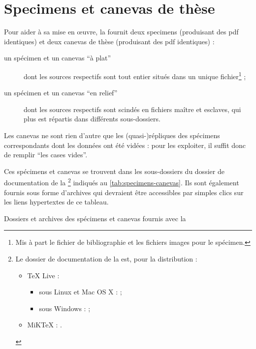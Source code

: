 \chapter{Specimens et canevas de thèse}\label{cha:specimen-canevas}%
%


Pour aider à sa mise en œuvre, la \yatcl fournit deux specimens (produisant
des \gls{pdf} identiques) et deux canevas de thèse (produisant des \gls{pdf}
identiques) :
\begin{description}
\item[un spécimen et un canevas \enquote{à plat}] dont les sources 
  respectifs sont tout entier situés dans un unique fichier\footnote{Mis à part
    le fichier de bibliographie et les fichiers images pour le spécimen.} ;
\item[un spécimen et un canevas \enquote{en relief}] dont les sources
   respectifs sont scindés en fichiers maître et esclaves, qui plus
  est répartis dans différents sous-dossiers.
\end{description}
Les canevas ne sont rien d'autre que les (quasi-)répliques des spécimens
correspondants dont les données ont été vidées : pour les exploiter, il suffit
donc de remplir \enquote{les cases vides}.

%
Ces spécimens et canevas se trouvent dans les sous-dossiers du dossier de
documentation de la \yatcl{}\footnote{Le dossier de documentation de la
  \yatcl{} est, pour la distribution :
  \begin{itemize}
  \item \TeX{} Live :
    \begin{itemize}
    \item sous Linux et Mac OS X :
      \unixtldirectory\tldistdirectory\jobdocdirectory{} ;
    \item sous Windows :
      \wintldirectory\tldistdirectory\jobdocdirectory{} ;
    \end{itemize}
  \item MiK\TeX{} : \miktexdistdirectory.
  \end{itemize}
  \label{fn:yathesisdocfolder}} indiqués au \vref{tab:specimens-canevas}. Ils
sont également fournis sous forme d'archives  qui devraient être
accessibles par simples clics sur les liens hypertextes de ce tableau.
\begin{table}
  \centering
  
  \caption{Dossiers et archives  des spécimens et canevas fournis
    avec la \yatcl{}}
  \label{tab:specimens-canevas}
\end{table}

